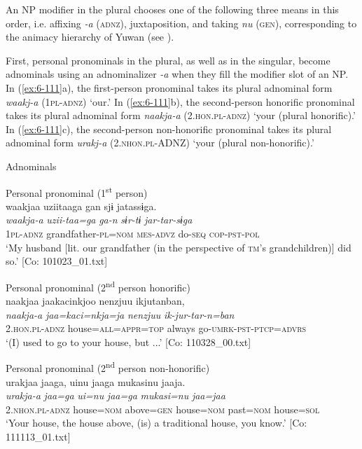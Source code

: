 An NP modifier in the plural chooses one of the following three means in this order, i.e. affixing \textit{-a} (\textsc{adnz}), juxtaposition, and taking \textit{nu} (\textsc{gen}), corresponding to the animacy hierarchy of Yuwan (see ).

First, personal pronominals in the plural, as well as in the singular, become adnominals using an adnominalizer \textit{-a} when they fill the modifier slot of an NP. In (\ref{ex:6-111}a), the first-person pronominal takes its plural adnominal form \textit{waakj-a} (1\textsc{pl}-\textsc{adnz}) ‘our.’ In (\ref{ex:6-111}b), the second-person honorific pronominal takes its plural adnominal form \textit{naakja-a} (2.\textsc{hon}.\textsc{pl}-\textsc{adnz}) ‘your (plural honorific).’ In (\ref{ex:6-111}c), the second-person non-honorific pronominal takes its plural adnominal form \textit{urakj-a} (2.\textsc{nhon}.\textsc{pl}-ADNZ) ‘your (plural non-honorific).’

\ea\label{ex:6-111}
  Adnominals

 \ea Personal pronominal (1\textsuperscript{st} person)\\
{\TM}
\glll  waakjaa  uziitaaga  gan  sjɨ    jatassɨga.\\
\textit{waakja-a}  \textit{uzii-taa=ga}  \textit{ga-n}  \textit{sɨr-tɨ} \textit{jar-tar-sɨga}\\
1\textsc{pl}-\textsc{adnz}  grandfather-\textsc{pl}=\textsc{nom}  \textsc{mes}-\textsc{advz}  do-\textsc{seq} \textsc{cop}-\textsc{pst}-\textsc{pol}\\
\glt ‘My husband [lit. our grandfather (in the perspective of \textsc{tm}’s grandchildren)] did so.’ [Co: 101023\_01.txt]

\ex Personal pronominal (2\textsuperscript{nd} person honorific)\\
{\TM}
\glll  naakjaa  jaakacinkjoo  {\textbar}nenzjuu{\textbar} ikjutanban,\\
\textit{naakja-a}  \textit{jaa=kaci=nkja=ja}  \textit{nenzjuu}   \textit{ik-jur-tar-n=ban}\\
2.\textsc{hon}.\textsc{pl}-\textsc{adnz}  house=\textsc{all}=\textsc{appr}=\textsc{top}  always go-\textsc{umrk}-\textsc{pst}-\textsc{ptcp}=\textsc{advrs}\\
\glt ‘(I) used to go to your house, but ...’ [Co: 110328\_00.txt]

\ex Personal pronominal (2\textsuperscript{nd} person non-honorific)\\
{\TM}
\glll  urakjaa  jaaga,  uinu  jaaga      mukasinu  jaaja.\\
\textit{urakja-a}  \textit{jaa=ga}  \textit{ui=nu}  \textit{jaa=ga}  \textit{mukasi=nu}  \textit{jaa=jaa}\\
2.\textsc{nhon}.\textsc{pl}-\textsc{adnz}  house=\textsc{nom}  above=\textsc{gen}  house=\textsc{nom} past=\textsc{nom}  house=\textsc{sol}\\
\glt ‘Your house, the house above, (is) a traditional house, you know.’ [Co: 111113\_01.txt]
\z
\z


